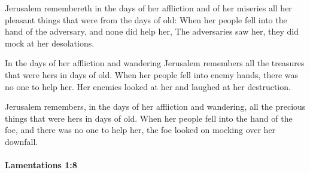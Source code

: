 			\begin{versebox}
					\item[BHS] 
					\item[LXX] 
					\item[ASV] Jerusalem remembereth in the days of her affliction and of her miseries all her pleasant things that were from the days of old: When her people fell into the hand of the adversary, and none did help her, The adversaries saw her, they did mock at her desolations.
					\item[NIV] In the days of her affliction and wandering Jerusalem remembers all the treasures that were hers in days of old. When her people fell into enemy hands, there was no one to help her. Her enemies looked at her and laughed at her destruction.
					\item[NRSV] Jerusalem remembers, in the days of her affliction and wandering, all the precious things that were hers in days of old. When her people fell into the hand of the foe, and there was no one to help her, the foe looked on mocking over her downfall.
			\end{versebox}

		\paragraph{Lamentations 1:8} %
			\label{LAMENTATIONS-1-8}

